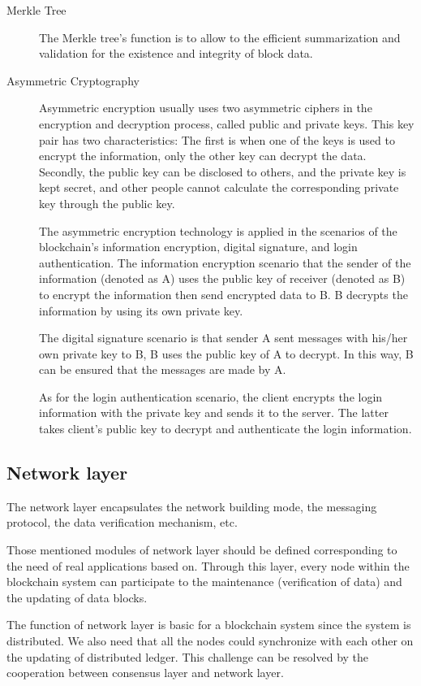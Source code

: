 \documentclass[doublespacing]{bmcart}
\begin{document}
\begin{CJK*}{UTF8}{gbsn}
\begin{description}
\item[Merkle Tree] 
 
The Merkle tree's function is to allow to the efficient summarization and validation for the existence and integrity of block data.
 
\item[Asymmetric Cryptography] 
Asymmetric encryption usually uses two asymmetric ciphers in the encryption and decryption process, called public and private keys. This key pair has two characteristics:  The first is when one of the keys is used to encrypt the information, only the other key can decrypt the data.
 Secondly, the public key can be disclosed to others, and the private key is kept secret, and other people cannot calculate the corresponding private key through the public key. 
 
 The asymmetric encryption technology is applied in the scenarios of the blockchain's information encryption, digital signature, and login authentication. The information encryption scenario that the sender of the information (denoted as A) uses the public key of receiver (denoted as B) to encrypt the information then send encrypted data to B. B  decrypts the information by using its own private key. 
 
 The digital signature scenario is that sender A sent messages with his/her own private key to B, B uses the public key of A to decrypt. In this way, B can be ensured that the messages are made by A. 
 
 As for the login authentication scenario, the client encrypts the login information with the private key and sends it to the server. The latter takes client's public key to decrypt and authenticate the login information.
\end{description}

\subsection{\textbf{Network layer}}	
  The network layer encapsulates the network building mode, the messaging protocol, the data verification mechanism, etc.
 
  Those mentioned modules of network layer should be defined corresponding to the need of real applications based on. Through this layer, every node within the blockchain system can participate to the maintenance (verification of data) and the updating of data blocks. 
 
  The function of network layer is basic for a blockchain system since the system is distributed. We also need that all the nodes could synchronize with each other on the updating of distributed ledger. This challenge can be resolved by the cooperation between consensus layer and network layer.
\begin{description}
 

\end{description}
\end{CJK*}
\end{document}
